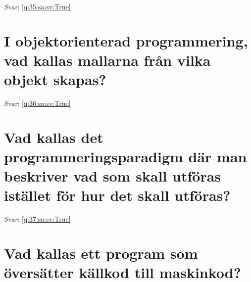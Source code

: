 \documentclass[a4paper,11pt,oneside]{book}
\begin{document}
\begin{sloppypar}
\label{q:35:sa:sv:False}

\vspace{2cm}

\noindent\makebox[\textwidth]{\hrulefill}

\vspace{1cm}

\textit{Svar}: \autoref{q:35:sa:sv:True}



\section{I objektorienterad programmering, vad kallas mallarna fr\r{a}n vilka objekt skapas?}

\label{q:36:sa:sv:False}

\vspace{2cm}

\noindent\makebox[\textwidth]{\hrulefill}

\vspace{1cm}

\textit{Svar}: \autoref{q:36:sa:sv:True}



\section{Vad kallas det programmeringsparadigm d\"ar man beskriver vad som skall utf\"oras ist\"allet f\"or hur det skall utf\"oras?}

\label{q:37:sa:sv:False}

\vspace{2cm}

\noindent\makebox[\textwidth]{\hrulefill}

\vspace{1cm}

\textit{Svar}: \autoref{q:37:sa:sv:True}



\section{Vad kallas ett program som \"overs\"atter k\"allkod till maskinkod?}

\label{q:38:sa:sv:False}

\vspace{2cm}

\noindent\makebox[\textwidth]{\hrulefill}

\vspace{1cm}


\end{sloppypar}
\end{document}
